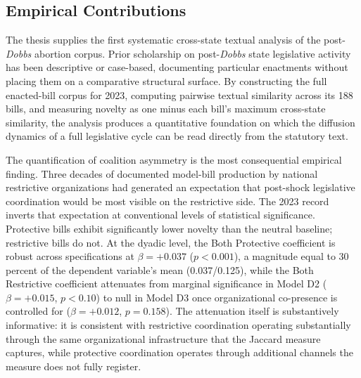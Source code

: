 \subsection{Empirical Contributions}
 
The thesis supplies the first systematic cross-state textual analysis of the post-\textit{Dobbs} abortion corpus. Prior scholarship on post-\textit{Dobbs} state legislative activity has been descriptive or case-based, documenting particular enactments without placing them on a comparative structural surface. By constructing the full enacted-bill corpus for 2023, computing pairwise textual similarity across its 188 bills, and measuring novelty as one minus each bill's maximum cross-state similarity, the analysis produces a quantitative foundation on which the diffusion dynamics of a full legislative cycle can be read directly from the statutory text.
 
The quantification of coalition asymmetry is the most consequential empirical finding. Three decades of documented model-bill production by national restrictive organizations had generated an expectation that post-shock legislative coordination would be most visible on the restrictive side. The 2023 record inverts that expectation at conventional levels of statistical significance. Protective bills exhibit significantly lower novelty than the neutral baseline; restrictive bills do not. At the dyadic level, the Both Protective coefficient is robust across specifications at $\beta = +0.037$ ($p < 0.001$), a magnitude equal to 30 percent of the dependent variable's mean (0.037/0.125), while the Both Restrictive coefficient attenuates from marginal significance in Model D2 ($\beta = +0.015$, $p < 0.10$) to null in Model D3 once organizational co-presence is controlled for ($\beta = +0.012$, $p = 0.158$). The attenuation itself is substantively informative: it is consistent with restrictive coordination operating substantially through the same organizational infrastructure that the Jaccard measure captures, while protective coordination operates through additional channels the measure does not fully register.
 
